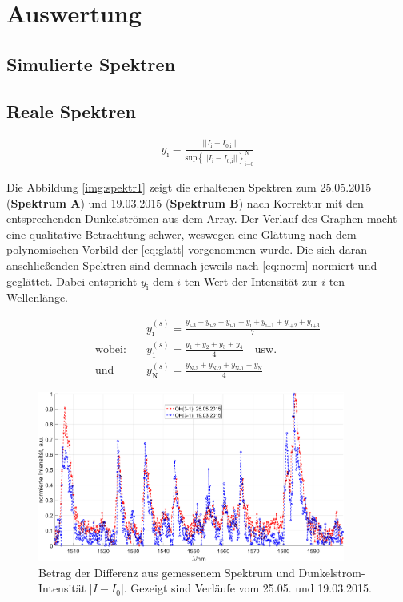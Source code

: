 \documentclass[numbers=noenddot,a4paper,notitlepage,twoside,BCOR15mm]{scrartcl}
\newcommand{\ix}[1]{_\text{#1}}
\newcommand{\fett}[1]{\textbf{#1}}
\begin{document}
	\newpage
	\section{Auswertung}

		\subsection{Simulierte Spektren}

		\subsection{Reale Spektren}

				\begin{align}
					y\ix{i}=\frac{||I\ix{i}-I\ix{0,i}||}{\text{sup}\left\lbrace ||I\ix{i}-I\ix{0,i}||\right\rbrace\ix{i=0}^{N}} \label{eq:norm}
				\end{align}

			Die Abbildung \autoref{img:spektr1} zeigt die erhaltenen Spektren zum  25.05.2015 (\fett{Spektrum A}) und 19.03.2015 (\fett{Spektrum B}) nach Korrektur mit den entsprechenden Dunkelströmen aus dem Array. Der Verlauf des Graphen macht eine qualitative Betrachtung schwer, weswegen eine Glättung nach dem polynomischen Vorbild der \autoref{eq:glatt} vorgenommen wurde. Die sich daran anschließenden Spektren sind demnach jeweils nach \autoref{eq:norm} normiert und geglättet. Dabei entspricht $y\ix{i}$ dem $i$-ten Wert der Intensität zur $i$-ten Wellenlänge.

				\begin{align}
					&y^{(s)}\ix{i}=\frac{y\ix{i-3}+y\ix{i-2}+y\ix{i-1}+y\ix{i}+y\ix{i+1}+y\ix{i+2}+y\ix{i+3}}{7} \label{eq:glatt} \\
					\text{wobei:} \quad &y^{(s)}\ix{1}=\frac{y\ix{1}+y\ix{2}+y\ix{3}+y\ix{4}}{4} \quad \text{usw.} \nonumber\\
					\text{und} \quad &y^{(s)}\ix{N}=\frac{y\ix{N-3}+y\ix{N-2}+y\ix{N-1}+y\ix{N}}{4} \nonumber
				\end{align}

				\begin{figure}[h]
					\centering
					\includegraphics[width=0.9\textwidth]{spektr_unsmooth.png}
					\caption{Betrag der Differenz aus gemessenem Spektrum und Dunkelstrom-Intensität $|I-I\ix{0}|$. Gezeigt sind Verläufe vom 25.05. und 19.03.2015.}
					\label{img:spektr1}
				\end{figure}
\end{document}
